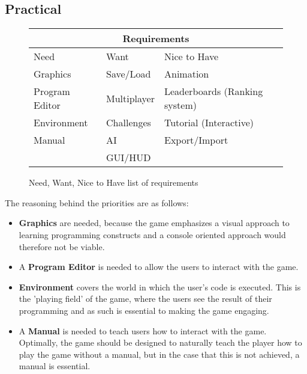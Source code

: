 \subsection{Practical}
\begin{figure}[ht]
\begin{center}
\begin{tabular}{|l|l|l|}
\hline
\multicolumn{3}{|c|}{Requirements}\\
\hline
Need & Want & Nice to Have\\
\hline
Graphics & Save/Load & Animation\\
Program Editor & Multiplayer & Leaderboards (Ranking system)\\
Environment & Challenges & Tutorial (Interactive)\\
Manual & AI & Export/Import\\
 & GUI/HUD & \\
\hline
\end{tabular}\newline
\caption{Need, Want, Nice to Have list of requirements}
\label{fig:req}
\end{center}
\end{figure}

The reasoning behind the priorities are as follows:

\begin{itemize}
	\item \textbf{Graphics} are needed, because the game emphasizes a visual approach to learning programming constructs and a console oriented approach would therefore not be viable.
	\item A \textbf{Program Editor} is needed to allow the users to interact with the game.
	\item \textbf{Environment} covers the world in which the user's code is executed.
	This is the 'playing field' of the game, where the users see the result of their programming and as such is essential to making the game engaging.
	\item A \textbf{Manual} is needed to teach users how to interact with the game.
	Optimally, the game should be designed to naturally teach the player how to play the game without a manual, but in the case that this is not achieved, a manual is essential.
\end{itemize}

